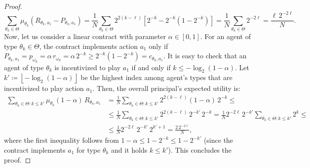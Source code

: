 \begin{proof}
	\[
		\sum_{\theta_k \in \Theta} \mu_{\theta_k} \left(  R_{\theta_k, a_1} - P_{\theta_k, a_1}  \right) = \frac{1}{N}\sum_{\theta_k \in \Theta} 2^{2(k - \ell)} \left[  2^{-k} - 2^{-k} \left( 1-2^{-k} \right)  \right] =\frac{1}{N}\sum_{\theta_k \in \Theta}   2^{-2\ell}= \frac{\ell \,  2^{-2\ell}}{N} .
	\]
	Now, let us consider a linear contract with parameter $\alpha \in [0,1]$.
	For an agent of type $\theta_k \in \Theta$, the contract implements action $a_1$ only if $P_{\theta_k, a_1} = p_{\omega_k} = \alpha\, r_{\omega_k} = \alpha\, 2^{-k} \geq  2^{-k} \left(  1- 2^{-k}  \right) = c_{\theta_k,a_1}$.
	It is easy to check that an agent of type $\theta_k$ is incentivized to play $a_1$ if and only if $k \leq - \log_2 (1 -\alpha)$.
	Let $k' \coloneqq \left\lfloor - \log_2 (1 -\alpha) \right\rfloor$ be the highest index among agent's types that are incentivized to play action $a_1$.
	Then, the overall principal's expected utility is:
	\begin{align*}
		\sum_{\theta_k \in \Theta: k \leq k'} \mu_{\theta_k} (1 -\alpha) \, R_{\theta_k, a_1} & =\frac{1}{N} \sum_{\theta_k \in \Theta: k \leq k'}2^{2(k - \ell)} (1 -\alpha) \, 2^{-k} \leq \\
		& \leq \frac{1}{N} \sum_{\theta_k \in \Theta: k \leq k'}2^{2(k - \ell)} \, 2^{-k'} \, 2^{-k} = \frac{1}{N} 2^{-2 \ell} \, 2^{-k'} \sum_{\theta_k \in \Theta: k \leq k'} 2^{k} \leq \\
		 & \leq \frac{1}{N} 2^{-2 \ell} \,2^{-k'} \,2^{k' +1} = \frac{2 \, 2^{-2 \ell}}{N},
	\end{align*}
	where the first inequality follows from $1 -\alpha \leq 1 - 2^{-k} \leq 1 - 2^{-k'}$ (since the contract implements $a_1$ for type $\theta_k$ and it holds $k \leq k'$). 
	This concludes the proof.
\end{proof}




